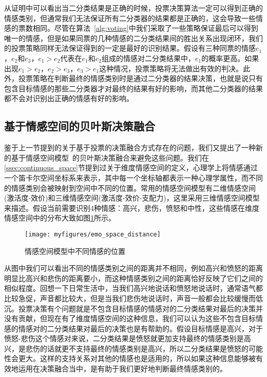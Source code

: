 从证明中可以看出当二分类结果是正确的时候，投票决策算法一定可以得到正确的情感类别，但通常我们无法保证所有二分类器的结果都是正确的，这会导致一些情感的票数相同。尽管在算法~\ref{alg:voting}中我们采取了一些策略保证最后可以得到唯一的情感，但是如果同票的几种情感的二分类结果间的胜出关系出现闭环，我们的投票策略同样无法保证得到的一定是最好的识别结果。假设有三种同票的情感$e_1$，$e_2$和$e_3$，$e_1>e_2$代表在$e_1$和$e_2$组成的情感对二分类结果中，$e_1$的概率更高。如果出现$e_1>e_2$，$e_2>e_3$，$e_3>e_1$这种情况，投票策略将无法做出有效的判决。此外，投票策略在判断最终的情感类别时是通过二分类器的结果决策，也就是说只有包含目标情感的那些二分类器才对最终的结果有好的影响，而其他二分类器的结果都不会对识别出正确的情感有好的影响。

\subsection{基于情感空间的贝叶斯决策融合}
\label{emo_space_decision_fusion}
鉴于上一节提到的关于基于投票的决策融合方式存在的问题，我们又提出了一种新的基于情感空间模型~\cite{Cowie2002Emotion}的贝叶斯决策融合来避免这些问题。我们在\ref{ssec:continuous_space}节提到过关于维度情感空间的定义，心理学上将情感通过一个笛卡尔空间坐标系来表示，其中每一个坐标轴都表示一种心理学属性，而不同的情感类别会被映射到空间中不同的位置。常用的情感空间模型有二维情感空间(激活度-效价)和三维情感空间(激活度-效价-支配力)，这里采用三维情感空间模型来描述。假设当前需要识别4种情感：高兴，悲伤，愤怒和中性，这些情感在维度情感空间中的分布大致如图\ref{fig:emo_space_distance}所示。

\begin{figure}[htb] %
    \centering
    \texttt{[image: myfigures/emo\_space\_distance]}
    \caption{情感空间模型中不同情感的位置}
    \label{fig:emo_space_distance}
\end{figure}

从图中我们可以看出不同的情感类别之间的距离并不相同，例如高兴和愤怒的距离明显比高兴和悲伤的距离要小，而这种情感类别之间的距离恰好反映了它们之间的相似程度。回想一下日常生活中，当我们高兴地说话和愤怒地说话时，通常语气都比较急促，声音都比较大，但是当我们悲伤地说话时，声音一般都会比较缓慢而低沉。投票决策有个问题就是不包含目标情感的情感对的二分类结果对最后的决策并没有贡献，但现在有了维度情感空间的这种信息，我们可以认为这些不包含目标情感的情感对的二分类结果对最后的决策也是有帮助的。假设目标情感是高兴，对于愤怒-悲伤这个情感对来说，二分类结果是愤怒就更加支持最终的情感类别是高兴，是悲伤的话就更不支持最终的情感类别是高兴，所以二分类结果是愤怒的可能性会更大。这样的支持关系对其他的情感也是适用的，所以如果这种信息能够被有效地运用在决策融合当中，是有助于我们更好地判断最终情感类别的。

